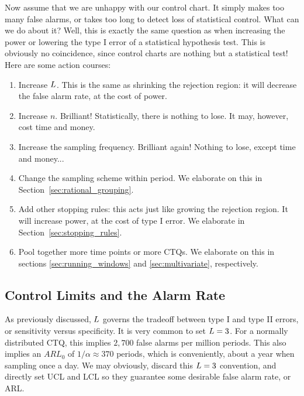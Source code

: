 Now assume that we are unhappy with our control chart. 
It simply makes too many false alarms, or takes too long to detect loss of statistical control.
What can we do about it?
Well, this is exactly the same question as when increasing the power or lowering the type I error of a statistical hypothesis test. This is obviously no coincidence, since control charts are nothing but a statistical test!
Here are some action courses:
\begin{enumerate}
\item Increase $L$. This is the same as shrinking the rejection region: 
it will decrease the false alarm rate, at the cost of power.
\item Increase $n$. Brilliant! Statistically, there is nothing to lose. It may, however, cost time and money.
\item Increase the sampling frequency. Brilliant again! Nothing to lose, except time and money...
\item Change the sampling scheme within period. We elaborate on this in Section~\ref{sec:rational_grouping}.
\item Add other stopping rules: 
this acts just like growing the rejection region. It will increase power, at the cost of type I error. We elaborate in Section~\ref{sec:stopping_rules}.
\item Pool together more time points or more CTQs. We elaborate on this in sections \ref{sec:running_windows} and  \ref{sec:multivariate}, respectively. 
\end{enumerate}






\subsection{Control Limits and the Alarm Rate}
As previously discussed, $L$ governs the tradeoff between type I and type II errors, or sensitivity versus specificity.
It is very common to set $L=3$. 
For a normally distributed CTQ, this implies $2,700$ false alarms per million periods. 
This also implies an $ARL_0$ of $1/\alpha \approx 370$ periods, which is conveniently, about a year when sampling once a day.
We may obviously, discard this $L=3$ convention, and directly set UCL and LCL so they guarantee some desirable false alarm rate, or ARL.

